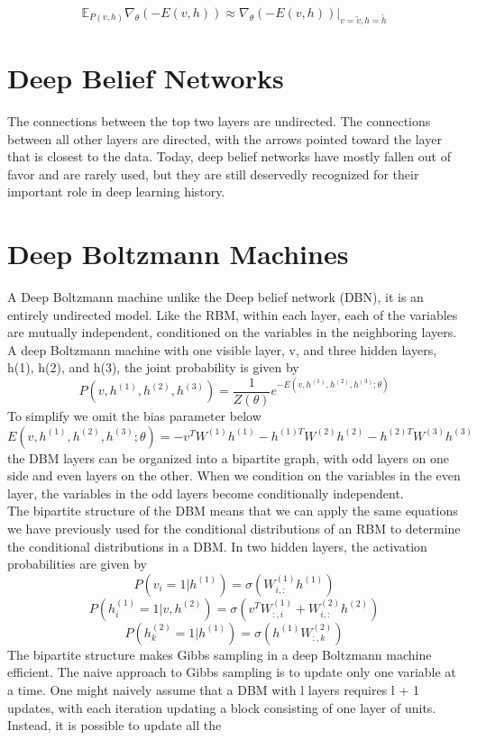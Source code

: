 \documentclass[letterpaper,10pt,english]{article}
\begin{document}
$$\mathbb{E}_{P(v,h)}\nabla_\theta (-E(v,h)) \approx \nabla_\theta (-E(v,h))|_{v=\tilde{v},h=\tilde{h}} $$


\section{Deep Belief Networks}
The connections between the top two layers
are undirected. The connections between all other layers are directed, with the
arrows pointed toward the layer that is closest to the data.  Today, deep belief
networks have mostly fallen out of favor and are rarely used, but they are still deservedly
recognized for their important role in deep learning history.

\section{Deep Boltzmann Machines}
A Deep Boltzmann machine unlike the Deep belief network (DBN), it is an entirely undirected model. Like the RBM, within each layer,
each of the variables are mutually independent, conditioned on the variables in
the neighboring layers. A deep Boltzmann machine with one visible layer, v, and three hidden layers,
h(1), h(2), and h(3), the joint probability is given by
$$P(v,h^{(1)},h^{(2)},h^{(3)})=\frac{1}{Z(\theta)}e^{-E(v,h^{(1)},h^{(2)},h^{(3)};\theta)}$$
To simplify we omit the bias parameter below
$$E(v,h^{(1)},h^{(2)},h^{(3)};\theta)=-v^TW^{(1)}h^{(1)}-h^{(1)T}W^{(2)}h^{(2)}-h^{(2)T}W^{(3)}h^{(3)}$$
the DBM layers
can be organized into a bipartite graph, with odd layers on one side and even layers
on the other. When we condition on the variables in
the even layer, the variables in the odd layers become conditionally independent.\\
The bipartite structure of the DBM means that we can apply the same
equations we have previously used for the conditional distributions of an RBM
to determine the conditional distributions in a DBM.
In two hidden layers, the activation probabilities are given by
$$P(v_i=1|h^{(1)})=\sigma(W_{i,:}^{(1)}h^{(1)})$$
$$P(h_i^{(1)}=1|v,h^{(2)})=\sigma(v^TW_{:,i}^{(1)}+W_{i,:}^{(2)}h^{(2)})$$
$$P(h_k^{(2)}=1|h^{(1)})=\sigma(h^{(1)}W_{:,k}^{(2)})$$
The bipartite structure makes Gibbs sampling in a deep Boltzmann machine
efficient. The naive approach to Gibbs sampling is to update only one variable
at a time. One might naively assume
that a DBM with l layers requires l + 1 updates, with each iteration updating
a block consisting of one layer of units. Instead, it is possible to update all the
\end{document}
